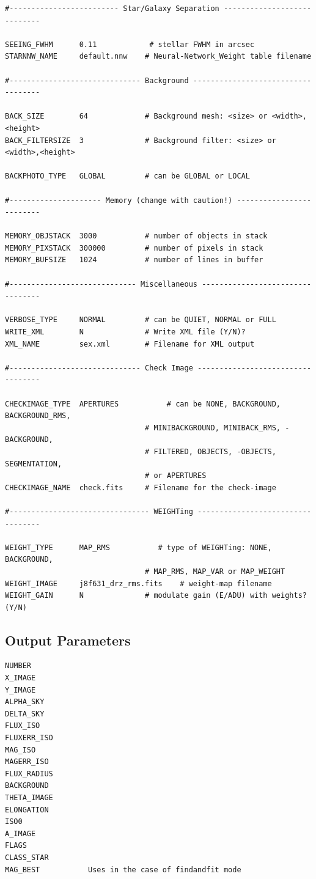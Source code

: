 \documentclass[a4paper,12pt]{article}
\begin{document}
\begin{footnotesize}
\begin{verbatim}
#------------------------- Star/Galaxy Separation ----------------------------
 
SEEING_FWHM      0.11            # stellar FWHM in arcsec
STARNNW_NAME     default.nnw    # Neural-Network_Weight table filename
 
#------------------------------ Background -----------------------------------
 
BACK_SIZE        64             # Background mesh: <size> or <width>,<height>
BACK_FILTERSIZE  3              # Background filter: <size> or <width>,<height>
 
BACKPHOTO_TYPE   GLOBAL         # can be GLOBAL or LOCAL
 
#--------------------- Memory (change with caution!) -------------------------
 
MEMORY_OBJSTACK  3000           # number of objects in stack
MEMORY_PIXSTACK  300000         # number of pixels in stack
MEMORY_BUFSIZE   1024           # number of lines in buffer
 
#----------------------------- Miscellaneous ---------------------------------
 
VERBOSE_TYPE     NORMAL         # can be QUIET, NORMAL or FULL
WRITE_XML        N              # Write XML file (Y/N)?
XML_NAME         sex.xml        # Filename for XML output

#------------------------------ Check Image ----------------------------------

CHECKIMAGE_TYPE  APERTURES           # can be NONE, BACKGROUND, BACKGROUND_RMS,
                                # MINIBACKGROUND, MINIBACK_RMS, -BACKGROUND,
                                # FILTERED, OBJECTS, -OBJECTS, SEGMENTATION,
                                # or APERTURES
CHECKIMAGE_NAME  check.fits     # Filename for the check-image

#-------------------------------- WEIGHTing ----------------------------------

WEIGHT_TYPE      MAP_RMS           # type of WEIGHTing: NONE, BACKGROUND,
                                # MAP_RMS, MAP_VAR or MAP_WEIGHT
WEIGHT_IMAGE     j8f631_drz_rms.fits    # weight-map filename
WEIGHT_GAIN      N              # modulate gain (E/ADU) with weights? (Y/N)
\end{verbatim}
\end{footnotesize}
\subsection{Output Parameters}
\begin{footnotesize}
\begin{verbatim}
NUMBER
X_IMAGE
Y_IMAGE
ALPHA_SKY
DELTA_SKY
FLUX_ISO
FLUXERR_ISO
MAG_ISO
MAGERR_ISO
FLUX_RADIUS
BACKGROUND
THETA_IMAGE
ELONGATION
ISO0
A_IMAGE
FLAGS
CLASS_STAR
MAG_BEST           Uses in the case of findandfit mode
\end{verbatim}
\end{footnotesize}
\end{document}
